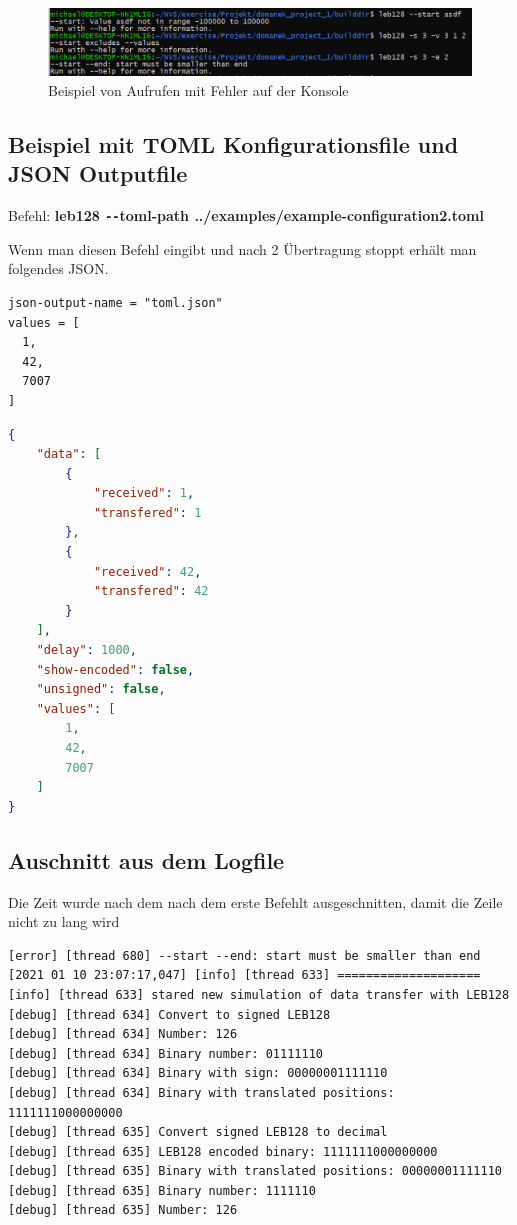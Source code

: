 \documentclass{article}
\newcommand{\twodashes}{\texttt{-{}-}}
\begin{document}
\begin{figure}[h]
\includegraphics[width=\linewidth]{KonsoleFehler}
\caption{Beispiel von Aufrufen mit Fehler auf der Konsole}
\end{figure}

\subsection{Beispiel mit TOML Konfigurationsfile und JSON Outputfile}
Befehl: \textbf{leb128 \twodashes toml-path ../examples/example-configuration2.toml}

Wenn man diesen Befehl eingibt und nach 2 Übertragung stoppt erhält man folgendes JSON.

\begin{lstlisting}[caption={TOML-Konfigurationsfile}, captionpos=b, frame=single, identifierstyle=\color{black}]
json-output-name = "toml.json"
values = [
  1,
  42,
  7007
]
\end{lstlisting}

\begin{lstlisting}[language=json,caption={JSON Outputfile}, captionpos=b]
{
    "data": [
        {
            "received": 1,
            "transfered": 1
        },
        {
            "received": 42,
            "transfered": 42
        }
    ],
    "delay": 1000,
    "show-encoded": false,
    "unsigned": false,
    "values": [
        1,
        42,
        7007
    ]
}
\end{lstlisting}

\subsection{Auschnitt aus dem Logfile}

Die Zeit wurde nach dem nach dem erste Befehlt ausgeschnitten, damit die Zeile nicht zu lang wird

\begin{lstlisting}[caption={Auschnit aus dem Logfile}, captionpos=b, basicstyle=\small, frame=lines]
[error] [thread 680] --start --end: start must be smaller than end
[2021 01 10 23:07:17,047] [info] [thread 633] ====================
[info] [thread 633] stared new simulation of data transfer with LEB128
[debug] [thread 634] Convert to signed LEB128
[debug] [thread 634] Number: 126
[debug] [thread 634] Binary number: 01111110
[debug] [thread 634] Binary with sign: 00000001111110
[debug] [thread 634] Binary with translated positions: 1111111000000000
[debug] [thread 635] Convert signed LEB128 to decimal
[debug] [thread 635] LEB128 encoded binary: 1111111000000000
[debug] [thread 635] Binary with translated positions: 00000001111110
[debug] [thread 635] Binary number: 1111110
[debug] [thread 635] Number: 126
\end{lstlisting}
\end{document}
